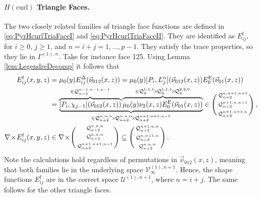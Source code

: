 \paragraph{\texorpdfstring{$H(\mathrm{curl})$}{Hcurl} Triangle Faces.}
The two closely related families of triangle face functions are defined in \eqref{eq:PyrHcurlTriaFaceI} and \eqref{eq:PyrHcurlTriaFaceII}. 
They are identified as $E_{ij}^\mathrm{f}$, for $i\geq0$, $j\geq1$, and $n=i+j=1,\ldots,p-1$.
They satisfy the trace properties, so they lie in $\Gamma^{(1),n}$.
Take for instance face 125.
Using Lemma \ref{lem:LegendreDecomp} it follows that
\begin{equation}
\begin{aligned}
	E_{ij}^\mathrm{f}(x,y,z)&=\mu_0(y)E_{ij}^\Tri(\vec{\nu}_{012}(x,z))
		=\mu_0(y)[P_i,L_{j}^\alpha](\vec{\nu}_{012}(x,z))E_{0}^\E(\vec{\nu}_{01}(x,z))\\
			&=\underbrace{\overbrace{[P_i,\chi_{j-1}](\vec{\nu}_{012}(x,z))}^{\in\mathcal{Q}_{n-1}^{n-1,n-1,n-1}}
				\overbrace{\mu_0(y)\nu_2(x,z)E_0^\E(\vec{\nu}_{01}(x,z))}^{
					\in\mathcal{Q}_3^{1,1,1}\!\times\!\mathcal{Q}_3^{1,1,1}\!\times\!\mathcal{Q}_3^{2,2,0}}}_{
						\in\mathcal{Q}_{n+2}^{n,n,n}\!\times\!\mathcal{Q}_{n+2}^{n,n,n}\!\times\!\mathcal{Q}_{n+2}^{n+1,n+1,n-1}}
							\in\Bigg(\begin{smallmatrix}\mathcal{Q}_{n+2}^{n,n+1,n+1}\\[2pt]\mathcal{Q}_{n+2}^{n+1,n,n+1}\\[2pt]
								\mathcal{Q}_{n+2}^{n+1,n+1,n}\end{smallmatrix}\Bigg)\,,\\
	\nabla \!\times\! E_{ij}^\mathrm{f}(x,y,z)
		&\in\nabla\!\times\!\Bigg(\begin{smallmatrix}\mathcal{Q}_{n+2}^{n,n,n}\\[2pt]\mathcal{Q}_{n+2}^{n,n,n}\\[2pt]
			\mathcal{Q}_{n+2}^{n+1,n+1,n-1}\end{smallmatrix}\Bigg)
				\subseteq\Bigg(\begin{smallmatrix}\mathcal{Q}_{n+3}^{n+1,n,n}\\[2pt]\mathcal{Q}_{n+3}^{n,n+1,n}\\[2pt]
					\mathcal{Q}_{n+2}^{n,n,n}\end{smallmatrix}\Bigg)\,.
\end{aligned}
\end{equation}
Note the calculations hold regardless of permutations in $\vec{\nu}_{012}(x,z)$, meaning that both families lie in the underlying space $\mathcal{V}_\infty^{(1),n+1}$.
Hence, the shape functions $E_{ij}^\mathrm{f}$ are in the correct space $\mathcal{U}^{(1),n+1}$, where $n=i+j$.
The same follows for the other triangle faces.

